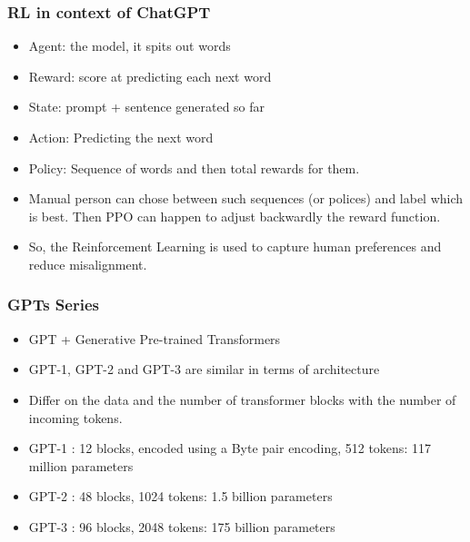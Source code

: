 \begin{frame}[fragile]\frametitle{RL in context of ChatGPT}


\begin{itemize}
\item Agent: the model, it spits out words
\item Reward: score at predicting each next word
\item State: prompt + sentence generated so far
\item Action: Predicting the next word
\item Policy: Sequence of words and then total rewards for them.
\item Manual person can chose between such sequences (or polices) and label which is best. Then PPO can happen to adjust backwardly the reward function.
\item So, the Reinforcement Learning is used to capture human preferences and reduce misalignment.
\end{itemize}	 
\end{frame}



\begin{frame}[fragile]\frametitle{GPTs Series}


\begin{itemize}
\item GPT + Generative Pre-trained Transformers
\item GPT-1, GPT-2 and GPT-3 are similar in terms of architecture 
\item Differ on the data and the number of transformer blocks with the number of incoming tokens.   
\item GPT-1 : 12 blocks, encoded using a Byte pair encoding, 512 tokens: 117 million parameters 
\item GPT-2 : 48 blocks, 1024 tokens: 1.5 billion parameters 
\item GPT-3 : 96 blocks, 2048 tokens: 175 billion parameters 
\end{itemize}	 

\end{frame}

